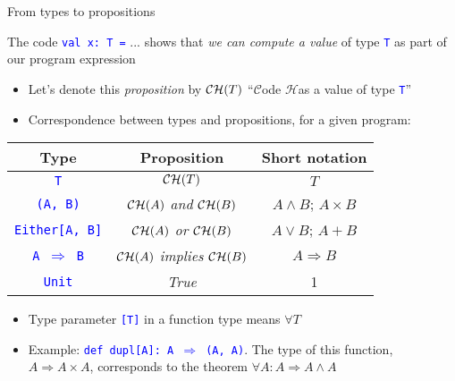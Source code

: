 \documentclass[english]{beamer}
\providecommand{\tabularnewline}{\\}
\begin{document}
\begin{frame}{From types to propositions}

The code \texttt{\textcolor{blue}{\footnotesize{}val x:\ T =}} ...
shows that \emph{we can compute a value} of type \texttt{\textcolor{blue}{\footnotesize{}T}}
as part of our program expression
\begin{itemize}
\item Let's denote this \emph{proposition} by ${\cal CH}(T)$ \textendash{}
``$\mathcal{C}$ode $\mathcal{H}$as a value of type \texttt{\textcolor{blue}{\footnotesize{}T}}''
\item Correspondence between types and propositions, for a given program:
\end{itemize}
\begin{center}
\begin{tabular}{|c|c|c|}
\hline 
\textbf{Type} &
\textbf{Proposition} &
\textbf{Short notation}\tabularnewline
\hline 
\hline 
\texttt{\textcolor{blue}{\footnotesize{}T}} &
${\cal CH}(T)$ &
$T$\tabularnewline
\hline 
\texttt{\textcolor{blue}{\footnotesize{}(A, B)}} &
${\cal CH}(A)$ \emph{and} ${\cal CH}(B)$ &
$A\wedge B$; $A\times B$\tabularnewline
\hline 
\texttt{\textcolor{blue}{\footnotesize{}Either{[}A, B{]}}} &
${\cal CH}(A)$ \emph{or} ${\cal CH}(B)$ &
$A\vee B$; $A+B$\tabularnewline
\hline 
\texttt{\textcolor{blue}{\footnotesize{}A $\Rightarrow$ B}} &
${\cal CH}(A)$ \emph{implies} ${\cal CH}(B)$ &
$A\Rightarrow B$\tabularnewline
\hline 
\texttt{\textcolor{blue}{\footnotesize{}Unit}} &
\emph{True} &
1\tabularnewline
\hline 
\end{tabular}
\par\end{center}
\begin{itemize}
\item Type parameter \texttt{\textcolor{blue}{\footnotesize{}{[}T{]}}} in
a function type means $\forall T$
\item Example: \texttt{\textcolor{blue}{\footnotesize{}def dupl{[}A{]}:\ A
$\Rightarrow$ (A, A)}}. The type of this function, $A\Rightarrow A\times A$,
corresponds to the theorem $\forall A:A\Rightarrow A\wedge A$
\end{itemize}
\end{frame}
\end{document}
